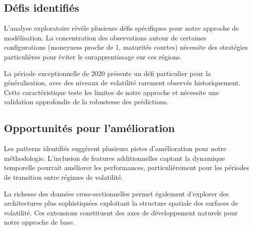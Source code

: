 \subsection{Défis identifiés}

L'analyse exploratoire révèle plusieurs défis spécifiques pour notre approche de modélisation. La concentration des observations autour de certaines configurations (moneyness proche de 1, maturités courtes) nécessite des stratégies particulières pour éviter le surapprentissage sur ces régions.

La période exceptionnelle de 2020 présente un défi particulier pour la généralisation, avec des niveaux de volatilité rarement observés historiquement. Cette caractéristique teste les limites de notre approche et nécessite une validation approfondie de la robustesse des prédictions.

\subsection{Opportunités pour l'amélioration}

Les patterns identifiés suggèrent plusieurs pistes d'amélioration pour notre méthodologie. L'inclusion de features additionnelles captant la dynamique temporelle pourrait améliorer les performances, particulièrement pour les périodes de transition entre régimes de volatilité.

La richesse des données cross-sectionnelles permet également d'explorer des architectures plus sophistiquées exploitant la structure spatiale des surfaces de volatilité. Ces extensions constituent des axes de développement naturels pour notre approche de base.
